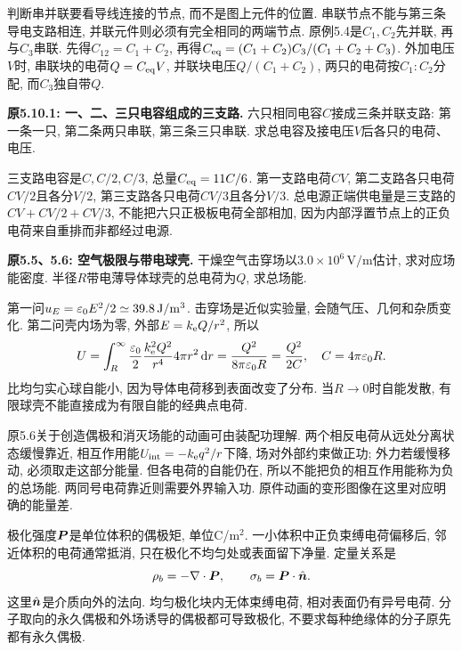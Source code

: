 \label{tb:cap-networks}
判断串并联要看导线连接的节点, 而不是图上元件的位置. 串联节点不能与第三条导电支路相连, 并联元件则必须有完全相同的两端节点. 原例5.4是$C_1,C_2$先并联, 再与$C_3$串联. 先得$C_{12}=C_1+C_2$, 再得$C_{\rm eq}=(C_1+C_2)C_3/(C_1+C_2+C_3)$. 外加电压$V$时, 串联块的电荷$Q=C_{\rm eq}V$, 并联块电压$Q/(C_1+C_2)$, 两只的电荷按$C_1:C_2$分配, 而$C_3$独自带$Q$.

\begin{example}
\textbf{原5.10.1: 一、二、三只电容组成的三支路.} 
六只相同电容$C$接成三条并联支路: 第一条一只, 第二条两只串联, 第三条三只串联. 求总电容及接电压$V$后各只的电荷、电压.
\end{example}
\begin{solution}
三支路电容是$C,C/2,C/3$, 总量$C_{\rm eq}=11C/6$. 第一支路电荷$CV$, 第二支路各只电荷$CV/2$且各分$V/2$, 第三支路各只电荷$CV/3$且各分$V/3$. 总电源正端供电量是三支路的$CV+CV/2+CV/3$, 不能把六只正极板电荷全部相加, 因为内部浮置节点上的正负电荷来自重排而非都经过电源.
\end{solution}

\label{tb:energy-create}
\begin{example}
\textbf{原5.5、5.6: 空气极限与带电球壳.} 
干燥空气击穿场以$3.0\times10^6\,\mathrm{V/m}$估计, 求对应场能密度. 半径$R$带电薄导体球壳的总电荷为$Q$, 求总场能.
\end{example}
\begin{solution}
第一问$u_E=\varepsilon_0 E^2/2\simeq39.8\,\mathrm{J/m^3}$. 击穿场是近似实验量, 会随气压、几何和杂质变化. 第二问壳内场为零, 外部$E=k_{\mathrm e} Q/r^2$, 所以
\[U=\int_R^\infty\frac{\varepsilon_0}2\frac{k_{\mathrm e}^2Q^2}{r^4}4\pi r^2\,\mathrm d r
=\frac{Q^2}{8\pi\varepsilon_0 R}=\frac{Q^2}{2C},\quad C=4\pi\varepsilon_0 R.\]
比均匀实心球自能小, 因为导体电荷移到表面改变了分布. 当$R\to0$时自能发散, 有限球壳不能直接成为有限自能的经典点电荷.
\end{solution}

原5.6关于创造偶极和消灭场能的动画可由装配功理解. 两个相反电荷从远处分离状态缓慢靠近, 相互作用能$U_{\rm int}=-k_{\mathrm e} q^2/r$下降, 场对外部约束做正功; 外力若缓慢移动, 必须取走这部分能量. 但各电荷的自能仍在, 所以不能把负的相互作用能称为负的总场能. 两同号电荷靠近则需要外界输入功. 原件动画的变形图像在这里对应明确的能量差.

\label{tb:dielectric-boundary}
极化强度$\boldsymbol{P}$是单位体积的偶极矩, 单位C/m$^2$. 一小体积中正负束缚电荷偏移后, 邻近体积的电荷通常抵消, 只在极化不均匀处或表面留下净量. 定量关系是
\[\rho_b=-\nabla\cdot\boldsymbol{P},\qquad \sigma_b=\boldsymbol{P}\cdot\hat{\boldsymbol{n}}.\]
这里$\hat{\boldsymbol{n}}$是介质向外的法向. 均匀极化块内无体束缚电荷, 相对表面仍有异号电荷. 分子取向的永久偶极和外场诱导的偶极都可导致极化, 不要求每种绝缘体的分子原先都有永久偶极.

